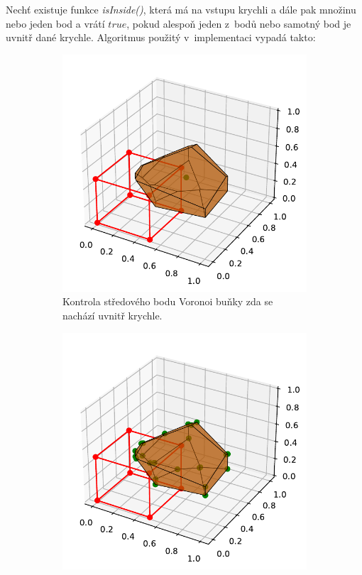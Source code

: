 Nechť existuje funkce \emph{isInside()}, která má na vstupu krychli a dále pak množinu nebo jeden bod a vrátí $true$, pokud alespoň jeden z~bodů nebo samotný bod je uvnitř dané krychle. Algoritmus použitý v~implementaci vypadá takto:

\begin{figure}
\begin{subfigure}[t]{0.29\columnwidth}
    \includegraphics[scale=0.5]{obrazky-figures/hashtree/center_point.pdf}
    \caption{Kontrola středového bodu Voronoi buňky zda se nachází uvnitř krychle.}
    \label{fig:colision_approx_center}
\end{subfigure}
\hfill
\begin{subfigure}[t]{0.29\columnwidth}
    \includegraphics[scale=0.5]{obrazky-figures/hashtree/vertex_box.pdf}

\end{subfigure}
\end{figure}
